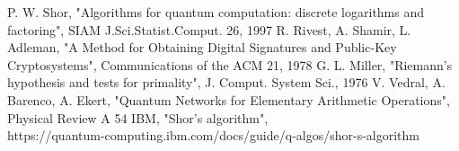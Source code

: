 \documentclass[conference]{IEEEtran}
\begin{document}
%
%


\begin{thebibliography}{00}
 P. W. Shor, "Algorithms for quantum computation: discrete logarithms and factoring", SIAM J.Sci.Statist.Comput. 26, 1997
 R. Rivest, A. Shamir, L. Adleman, "A Method for Obtaining Digital Signatures and Public-Key Cryptosystems", Communications of the ACM 21, 1978
 G. L. Miller, "Riemann's hypothesis and tests for primality", J. Comput. System Sci., 1976
 V. Vedral, A. Barenco, A. Ekert, "Quantum Networks for Elementary Arithmetic Operations", Physical Review A 54
 IBM, "Shor's algorithm",\\https://quantum-computing.ibm.com/docs/guide/q-algos/shor-s-algorithm
\end{thebibliography}
\vspace{12pt}
\end{document}
